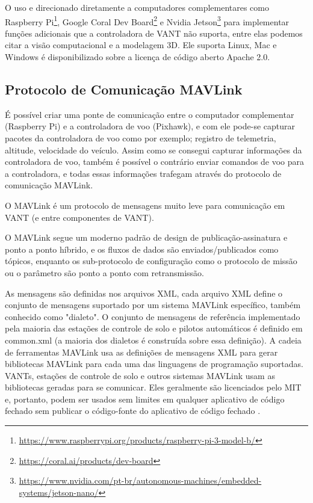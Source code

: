 O uso e direcionado diretamente a computadores complementares como Raspberry Pi\footnote{\url{https://www.raspberrypi.org/products/raspberry-pi-3-model-b/}}, Google Coral Dev Board\footnote{\url{https://coral.ai/products/dev-board}} e Nvidia Jetson\footnote{\url{https://www.nvidia.com/pt-br/autonomous-machines/embedded-systems/jetson-nano/}} para implementar funções adicionais que a controladora de VANT não suporta, entre elas podemos citar a visão computacional e a modelagem 3D. Ele suporta Linux, Mac e Windows é disponibilizado sobre a licença de código aberto Apache 2.0.

\subsection{Protocolo de Comunicação MAVLink}
É possível criar uma ponte de comunicação entre o computador complementar (Raspberry Pi) e a controladora de voo (Pixhawk), e com ele pode-se capturar pacotes da controladora de voo como por exemplo; registro de telemetria, altitude, velocidade do veículo.
Assim como se consegui capturar informações da controladora de voo, também é possível o contrário enviar comandos de voo para a controladora, e todas essas informações trafegam através do protocolo de comunicação MAVLink.

O MAVLink é um protocolo de mensagens muito leve para comunicação em VANT (e entre componentes de VANT).

O MAVLink segue um moderno padrão de design de publicação-assinatura e ponto a ponto híbrido, e os fluxos de dados são enviados/publicados como tópicos, enquanto os sub-protocolo de configuração como o protocolo de missão ou o parâmetro são ponto a ponto com retransmissão.

As mensagens são definidas nos arquivos XML, cada arquivo XML define o conjunto de mensagens suportado por um sistema MAVLink específico, também conhecido como "dialeto". O conjunto de mensagens de referência implementado pela maioria das estações de controle de solo e pilotos automáticos é definido em common.xml (a maioria dos dialetos é construída sobre essa definição).
A cadeia de ferramentas MAVLink usa as definições de mensagens XML para gerar bibliotecas MAVLink para cada uma das linguagens de programação suportadas. VANTs, estações de controle de solo e outros sistemas MAVLink usam as bibliotecas geradas para se comunicar. Eles geralmente são licenciados pelo MIT e, portanto, podem ser usados sem limites em qualquer aplicativo de código fechado sem publicar o código-fonte do aplicativo de código fechado \cite{treze}.

